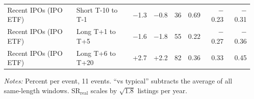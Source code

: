 \begin{table}[!htbp]
\begin{threeparttable}
\begin{tabular}{llrrrrrr}
Recent IPOs (IPO ETF) & Short T-10 to T-1 & $-$1.3 & $-$0.8 & 36 & 0.69 & $-$0.23 & $-$0.31 \\
Recent IPOs (IPO ETF) & Long T+1 to T+5 & $-$1.6 & $-$1.8 & 55 & 0.22 & $-$0.27 & $-$0.36 \\
Recent IPOs (IPO ETF) & Long T+6 to T+20 & +2.7 & +2.2 & 82 & 0.36 & 0.33 & 0.45 \\
\bottomrule
\end{tabular}
\begin{tablenotes}[flushleft]\footnotesize
\item \textit{Notes:} Percent per event, 11 events. ``vs typical'' subtracts the average of all same-length windows. SR$_\text{real}$ scales by $\sqrt{1.8}$ listings per year.
\end{tablenotes}
\end{threeparttable}

\end{table}
